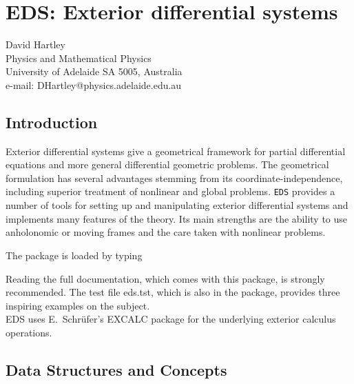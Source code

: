 \chapter{EDS: Exterior differential systems}
\label{EDS}

{\footnotesize
\begin{center}
David Hartley \\
Physics and Mathematical Physics \\
University of Adelaide SA 5005, Australia \\
e-mail: DHartley@physics.adelaide.edu.au
\end{center}
}

\section{Introduction}

Exterior differential systems give a geometrical framework for partial
differential equations and more general differential geometric problems.
The geometrical formulation has several advantages stemming from its
coordinate-independence, including superior treatment of nonlinear and
global problems. {\tt EDS} provides a number of tools for setting up and 
manipulating exterior differential systems and implements many features of 
the theory. Its main strengths are the ability to use anholonomic or moving 
frames and the care taken with nonlinear problems.

The package is loaded 
by typing  \par
Reading the full documentation, which comes with this 
package, is strongly recommended.
The test file eds.tst, which is also in the package,  provides
three inspiring examples on the subject. \\
EDS uses E.~Schr{\"u}fer's EXCALC package for the underlying
exterior calculus operations.

\section{Data Structures and Concepts}

